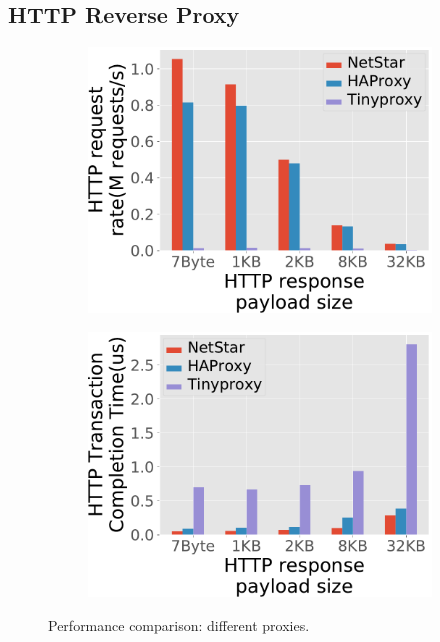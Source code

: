 \subsection{HTTP Reverse Proxy}
\label{sec:eval3}

\begin{figure}[!h]
  \begin{subfigure}[t]{0.49\linewidth}
    \centering
    \includegraphics[width=\columnwidth]{chap-netstar/figure_src/Proxy_throughput.pdf}
    \caption{}\label{fig:eval4.1}
  \end{subfigure}\hfill
  \begin{subfigure}[t]{0.49\linewidth}
    \centering
    \includegraphics[width=\columnwidth]{chap-netstar/figure_src/Proxy_RTT.pdf}
    \caption{}\label{fig:eval4.2}
  \end{subfigure}
\caption{Performance comparison: different proxies.}%
\label{fig:eval4}
\end{figure}


